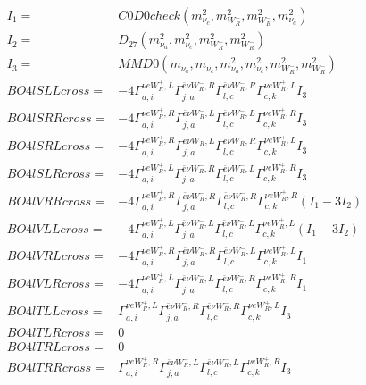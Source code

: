 \documentclass[A4,landscape]{article}
\begin{document}
\begin{align} 
I_1 = & C0D0check(m^2_{\nu_{{c}}}, m^2_{W_R^-}, m^2_{W_R^-}, m^2_{\nu_{{a}}}) \\ 
I_2 = & D_{27}(m^2_{\nu_{{a}}}, m^2_{\nu_{{c}}}, m^2_{W_R^-}, m^2_{W_R^-}) \\ 
I_3 = & MMD0(m_{\nu_{{a}}}, m_{\nu_{{c}}}, m^2_{\nu_{{a}}}, m^2_{\nu_{{c}}}, m^2_{W_R^-}, m^2_{W_R^-}) \\ 
  BO4lSLLcross= & -4  \Gamma^{\nu e W_R^+,L}_{a, i} \Gamma^{\bar{e}\nu W_R^- ,R}_{j, a} \Gamma^{\bar{e}\nu W_R^- ,R}_{l, c} \Gamma^{\nu e W_R^+,L}_{c, k} I_3 \\ 
  BO4lSRRcross= & -4  \Gamma^{\nu e W_R^+,R}_{a, i} \Gamma^{\bar{e}\nu W_R^- ,L}_{j, a} \Gamma^{\bar{e}\nu W_R^- ,L}_{l, c} \Gamma^{\nu e W_R^+,R}_{c, k} I_3 \\ 
  BO4lSRLcross= & -4  \Gamma^{\nu e W_R^+,R}_{a, i} \Gamma^{\bar{e}\nu W_R^- ,L}_{j, a} \Gamma^{\bar{e}\nu W_R^- ,R}_{l, c} \Gamma^{\nu e W_R^+,L}_{c, k} I_3 \\ 
  BO4lSLRcross= & -4  \Gamma^{\nu e W_R^+,L}_{a, i} \Gamma^{\bar{e}\nu W_R^- ,R}_{j, a} \Gamma^{\bar{e}\nu W_R^- ,L}_{l, c} \Gamma^{\nu e W_R^+,R}_{c, k} I_3 \\ 
  BO4lVRRcross= & -4  \Gamma^{\nu e W_R^+,R}_{a, i} \Gamma^{\bar{e}\nu W_R^- ,R}_{j, a} \Gamma^{\bar{e}\nu W_R^- ,R}_{l, c} \Gamma^{\nu e W_R^+,R}_{c, k} (I_1 - 3 I_2) \\ 
  BO4lVLLcross= & -4  \Gamma^{\nu e W_R^+,L}_{a, i} \Gamma^{\bar{e}\nu W_R^- ,L}_{j, a} \Gamma^{\bar{e}\nu W_R^- ,L}_{l, c} \Gamma^{\nu e W_R^+,L}_{c, k} (I_1 - 3 I_2) \\ 
  BO4lVRLcross= & -4  \Gamma^{\nu e W_R^+,R}_{a, i} \Gamma^{\bar{e}\nu W_R^- ,R}_{j, a} \Gamma^{\bar{e}\nu W_R^- ,L}_{l, c} \Gamma^{\nu e W_R^+,L}_{c, k} I_1 \\ 
  BO4lVLRcross= & -4  \Gamma^{\nu e W_R^+,L}_{a, i} \Gamma^{\bar{e}\nu W_R^- ,L}_{j, a} \Gamma^{\bar{e}\nu W_R^- ,R}_{l, c} \Gamma^{\nu e W_R^+,R}_{c, k} I_1 \\ 
  BO4lTLLcross= &  \Gamma^{\nu e W_R^+,L}_{a, i} \Gamma^{\bar{e}\nu W_R^- ,R}_{j, a} \Gamma^{\bar{e}\nu W_R^- ,R}_{l, c} \Gamma^{\nu e W_R^+,L}_{c, k} I_3 \\ 
  BO4lTLRcross= & 0 \\ 
  BO4lTRLcross= & 0 \\ 
  BO4lTRRcross= &  \Gamma^{\nu e W_R^+,R}_{a, i} \Gamma^{\bar{e}\nu W_R^- ,L}_{j, a} \Gamma^{\bar{e}\nu W_R^- ,L}_{l, c} \Gamma^{\nu e W_R^+,R}_{c, k} I_3 \\ 
\end{align} 
\end{document}
